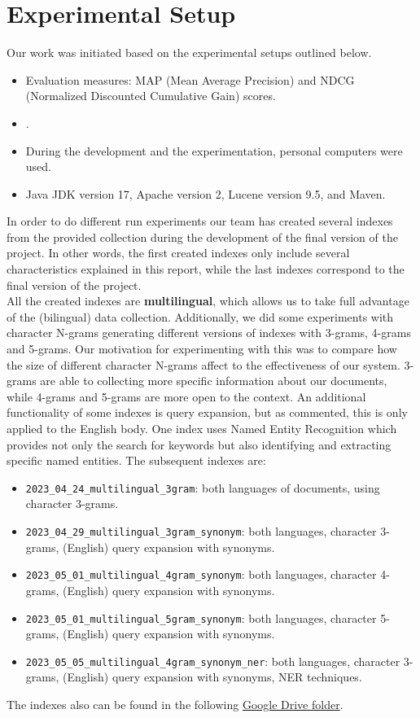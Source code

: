 \section{Experimental Setup}
\label{sec:setup}

Our work was initiated based on the experimental setups outlined below.
\begin{itemize}
	\item Evaluation measures: MAP (Mean Average Precision) and NDCG (Normalized Discounted Cumulative Gain) scores.
	\item \citep[Repository]{jihuming}.
	\item During the development and the experimentation, personal computers were used.
	\item Java JDK version 17, Apache version 2, Lucene version 9.5, and Maven.
\end{itemize}
In order to do different run experiments our team has created several indexes from the provided collection during the
development of the final version of the project.
In other words, the first created indexes only include several characteristics explained in this report, while the last
indexes correspond to the final version of the project.\\
All the created indexes are \textbf{multilingual}, which allows us to take full advantage of the (bilingual) data
collection.
Additionally, we did some experiments with character N-grams generating different versions of indexes with 3-grams,
4-grams and 5-grams.
Our motivation for experimenting with this was to compare how the size of different character N-grams affect to the
effectiveness of our system.
3-grams are able to collecting more specific information about our documents, while 4-grams and 5-grams are more open
to the context.
An additional functionality of some indexes is query expansion, but as commented, this is only applied to the English
body.
One index uses Named Entity Recognition which provides not only the search for keywords but also identifying and
extracting specific named entities.
The subsequent indexes are:
\begin{itemize}
	\item \texttt{2023\_04\_24\_multilingual\_3gram}: both languages of documents, using character 3-grams.
	\item \texttt{2023\_04\_29\_multilingual\_3gram\_synonym}: both languages, character 3-grams, (English) query expansion with synonyms.
	\item \texttt{2023\_05\_01\_multilingual\_4gram\_synonym}: both languages, character 4-grams, (English) query expansion with synonyms.
	\item \texttt{2023\_05\_01\_multilingual\_5gram\_synonym}: both languages, character 5-grams, (English) query expansion with synonyms.
	\item \texttt{2023\_05\_05\_multilingual\_4gram\_synonym\_ner}: both languages, character 3-grams, (English) query expansion with synonyms, NER techniques.
\end{itemize}

The indexes also can be found in the following
\href{https://drive.google.com/drive/folders/1CK_kLeZ5Us3VJe8hiG1vhwPrDs94cLvU?usp=share_link}{Google Drive folder}.